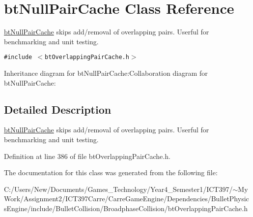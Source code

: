 \hypertarget{classbt_null_pair_cache}{
\section{btNullPairCache Class Reference}
\label{classbt_null_pair_cache}
}
\hyperlink{classbt_null_pair_cache}{btNullPairCache} skips add/removal of overlapping pairs. Userful for benchmarking and unit testing.  


{\tt \#include $<$btOverlappingPairCache.h$>$}

Inheritance diagram for btNullPairCache:Collaboration diagram for btNullPairCache:

\subsection{Detailed Description}
\hyperlink{classbt_null_pair_cache}{btNullPairCache} skips add/removal of overlapping pairs. Userful for benchmarking and unit testing. 

Definition at line 386 of file btOverlappingPairCache.h.

The documentation for this class was generated from the following file:\begin{CompactItemize}
\item 
C:/Users/New/Documents/Games\_\-Technology/Year4\_\-Semester1/ICT397/$\sim$My Work/Assignment2/ICT397Carre/CarreGameEngine/Dependencies/BulletPhysicsEngine/include/BulletCollision/BroadphaseCollision/btOverlappingPairCache.h\end{CompactItemize}
